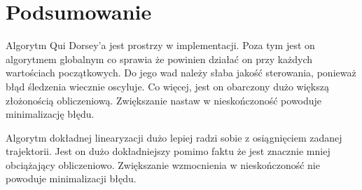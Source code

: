 \documentclass[12pt,a4paper]{article}
\begin{document}
\section{Podsumowanie}
  Algorytm Qui Dorsey’a jest prostrzy w implementacji. Poza tym jest on algorytmem globalnym co sprawia że powinien działać on przy każdych wartościach początkowych. Do jego wad należy słaba jakość sterowania, ponieważ błąd śledzenia wiecznie oscyluje. Co więcej, jest on obarczony dużo większą złożonością obliczeniową. Zwiększanie nastaw w nieskończoność powoduje minimalizację błędu.

  Algorytm dokładnej linearyzacji dużo lepiej radzi sobie z osiągnięciem zadanej trajektorii. Jest on dużo dokładniejszy pomimo faktu że jest znacznie mniej obciążający obliczeniowo. Zwiększanie wzmocnienia w nieskończoność nie powoduje minimalizacji błędu.
\end{document}
